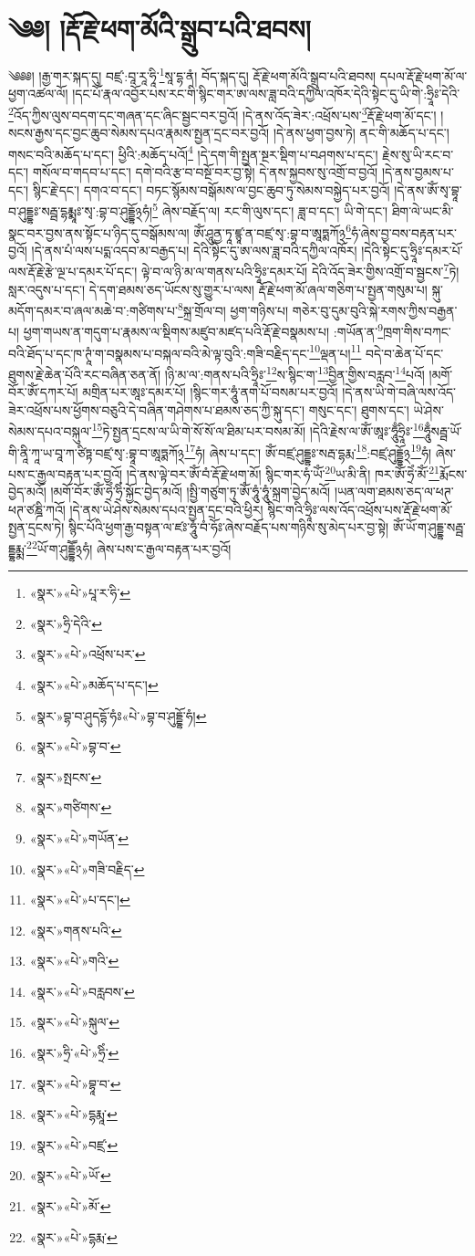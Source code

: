 \chapter{༄༅། །རྡོ་རྗེ་ཕག་མོའི་སྒྲུབ་པའི་ཐབས།}༄༅༅། །རྒྱ་གར་སྐད་དུ། བཛྲ་:བཱ་རཱ་ཧཱི་\footnote{«སྣར་»«པེ་»པཱ་ར་ཧི་}སཱ་དྷ་ནཾ། བོད་སྐད་དུ། རྡོ་རྗེ་ཕག་མོའི་སྒྲུབ་པའི་ཐབས། དཔལ་རྡོ་རྗེ་ཕག་མོ་ལ་ཕྱག་འཚལ་ལོ། །དང་པོ་རྣལ་འབྱོར་པས་རང་གི་སྙིང་གར་ཨ་ལས་ཟླ་བའི་དཀྱིལ་འཁོར་དེའི་སྟེང་དུ་ཡི་གེ་:ཧྲཱིཿ་དེའི་\footnote{«སྣར་»ཧྲི་དེའི་}འོད་ཀྱིས་ལུས་བདག་དང་གཞན་དང་ཞིང་སྦྱང་བར་བྱའོ། །དེ་ནས་འོད་ཟེར་:འཕྲོས་པས་\footnote{«སྣར་»«པེ་»འཕྲོས་པར་}རྡོ་རྗེ་ཕག་མོ་དང་། །སངས་རྒྱས་དང་བྱང་ཆུབ་སེམས་དཔའ་རྣམས་སྤྱན་དྲང་བར་བྱའོ། །དེ་ནས་ཕྱག་བྱས་ཏེ། ནང་གི་མཆོད་པ་དང་། གསང་བའི་མཆོད་པ་དང་། ཕྱིའི་:མཆོད་པའོ།\footnote{«སྣར་»«པེ་»མཆོད་པ་དང་།} །དེ་དག་གི་སྤྱན་སྔར་སྡིག་པ་བཤགས་པ་དང་། རྗེས་སུ་ཡི་རང་བ་དང་། གསོལ་བ་གདབ་པ་དང་། དགེ་བའི་རྩ་བ་བསྔོ་བར་བྱ་སྟེ། དེ་ནས་སྐྱབས་སུ་འགྲོ་བ་བྱའོ། །དེ་ནས་བྱམས་པ་དང་། སྙིང་རྗེ་དང་། དགའ་བ་དང་། བཏང་སྙོམས་བསྒོམས་ལ་བྱང་ཆུབ་ཏུ་སེམས་བསྐྱེད་པར་བྱའོ། །དེ་ནས་ཨོཾ་སྭ་བྷཱ་བ་ཤུདྡྷཿ་སརྦྦ་དྷརྨྨཱཿ་སྭ་:བྷ་བ་ཤུདྡྷོ྅ཧཾ།\footnote{«སྣར་»བྷ་བ་ཤུདདྷོ་ཧཾཿ«པེ་»བྷ་བ་ཤུདྡྷོ་ཧཾ།} ཞེས་བརྗོད་ལ། རང་གི་ལུས་དང་། ཟླ་བ་དང་། ཡི་གེ་དང་། ཐིག་ལེ་ཡང་མི་སྣང་བར་བྱས་ནས་སྟོང་པ་ཉིད་དུ་བསྒོམས་ལ། ཨོཾ་ཤཱུནྱ་ཏཱ་ཛྙཱ་ན་བཛྲ་སྭ་:བྷ་བ་ཨཱཏྨཀོ྅\footnote{«སྣར་»«པེ་»བྷ་བ་}ཧཾ་ཞེས་བྱ་བས་བརྟན་པར་བྱའོ། །དེ་ནས་པཾ་ལས་པདྨ་འདབ་མ་བརྒྱད་པ། དེའི་སྟེང་དུ་ཨ་ལས་ཟླ་བའི་དཀྱིལ་འཁོར། །དེའི་སྟེང་དུ་ཧྲཱིཿ་དམར་པོ་ལས་རྡོ་རྗེ་རྩེ་ལྔ་པ་དམར་པོ་དང་། ལྟེ་བ་ལ་ཉི་མ་ལ་གནས་པའི་ཧྲཱིཿ་དམར་པོ། དེའི་འོད་ཟེར་གྱིས་འགྲོ་བ་སྦྱངས་\footnote{«སྣར་»སྤངས་}ཏེ། སླར་འདུས་པ་དང་། དེ་དག་ཐམས་ཅད་ཡོངས་སུ་གྱུར་པ་ལས། རྡོ་རྗེ་ཕག་མོ་ཞལ་གཅིག་པ་སྤྱན་གསུམ་པ། སྐུ་མདོག་དམར་བ་ཞལ་མཆེ་བ་:གཙིགས་པ་\footnote{«སྣར་»གཙིགས་}སྐྲ་གྲོལ་བ། ཕྱག་གཉིས་པ། གཅེར་བུ་དུམ་བུའི་སྐེ་རགས་ཀྱིས་བརྒྱན་པ། ཕྱག་གཡས་ན་གདུག་པ་རྣམས་ལ་སྡིགས་མཛུབ་མཛད་པའི་རྡོ་རྗེ་བསྣམས་པ། :གཡོན་ན་\footnote{«སྣར་»«པེ་»གཡོན་}ཁྲག་གིས་བཀང་བའི་ཐོད་པ་དང་ཁ་ཊཱཾ་ག་བསྣམས་པ་བསྐལ་བའི་མེ་ལྟ་བུའི་:གཟི་བརྗིད་དང་\footnote{«སྣར་»«པེ་»གཟི་བརྗིད་}ལྡན་པ།\footnote{«སྣར་»«པེ་»པ་དང་།} བདེ་བ་ཆེན་པོ་དང་ཐུགས་རྗེ་ཆེན་པོའི་རང་བཞིན་ཅན་ནོ། །ཉི་མ་ལ་:གནས་པའི་ཧྲཱིཿ་\footnote{«སྣར་»གནས་པའི་}ས་སྙིང་ག་\footnote{«སྣར་»«པེ་»གའི་}བྱིན་གྱིས་བརླབ་\footnote{«སྣར་»«པེ་»བརླབས་}པའོ། །མགོ་བོར་ཨོཾ་དཀར་པོ། མགྲིན་པར་ཨཱཿ་དམར་པོ། །སྙིང་གར་ཧཱུཾ་ནག་པོ་བསམ་པར་བྱའོ། །དེ་ནས་ཡི་གེ་བཞི་ལས་འོད་ཟེར་འཕྲོས་པས་ཕྱོགས་བཅུའི་དེ་བཞིན་གཤེགས་པ་ཐམས་ཅད་ཀྱི་སྐུ་དང་། གསུང་དང་། ཐུགས་དང་། ཡེ་ཤེས་སེམས་དཔའ་བསྐུལ་\footnote{«སྣར་»«པེ་»སྐུལ་}ཏེ་སྤྱན་དྲངས་ལ་ཡི་གེ་སོ་སོ་ལ་ཐིམ་པར་བསམ་མོ། །དེའི་རྗེས་ལ་ཨོཾ་ཨཱཿ་ཧཱུྃཧྲཱིཿ་\footnote{«སྣར་»ཧྲི་«པེ་»ཧྲིཾ་}ཧཱུྃསརྦྦ་ཡོ་གི་ནཱི་ཀཱ་ཡ་བཱ་ཀ་ཙིཏྟ་བཛྲ་སྭ་:བྷཱ་བ་ཨཱཏྨཀོ྅\footnote{«སྣར་»«པེ་»བྷཱ་བ་}ཧཾ། ཞེས་པ་དང་། ཨོཾ་བཛྲ་ཤུདྡྷཿ་སརྦ་དྷརྨ་\footnote{«སྣར་»«པེ་»དྷརྨཱ་}:བཛྲ་ཤུདྡྷོ྅\footnote{«སྣར་»«པེ་»བཛྲ་}ཧཾ། ཞེས་པས་ང་རྒྱལ་བརྟན་པར་བྱའོ། །དེ་ནས་ལྟེ་བར་ཨོཾ་བཾ་རྡོ་རྗེ་ཕག་མོ། སྙིང་གར་ཧཾ་ཡོཾ་\footnote{«སྣར་»«པེ་»ཡོ་}ཡ་མི་ནི། ཁར་ཨོཾ་ཧྲེཾ་མོཾ་\footnote{«སྣར་»«པེ་»མོ་}རྨོངས་བྱེད་མའོ། །མགོ་བོར་ཨོཾ་ཧྲེཾ་ཧྲིཾ་སྐྱོང་བྱེད་མའོ། །སྤྱི་གཙུག་ཏུ་ཨོཾ་ཧཱུཾ་ཧཱུཾ་སྐྲག་བྱེད་མའོ། །ཡན་ལག་ཐམས་ཅད་ལ་ཕཊ་ཕཊ་ཙཎྜི་ཀའོ། །དེ་ནས་ཡེ་ཤེས་སེམས་དཔའ་སྤྱན་དྲང་བའི་ཕྱིར། སྙིང་གའི་ཧྲཱིཿ་ལས་འོད་འཕྲོས་པས་རྡོ་རྗེ་ཕག་མོ་སྤྱན་དྲངས་ཏེ། སྙིང་པོའི་ཕྱག་རྒྱ་བསྟན་ལ་ཛཿ་ཧཱུཾ་བཾ་ཧོཿ་ཞེས་བརྗོད་པས་གཉིས་སུ་མེད་པར་བྱ་སྟེ། ཨོཾ་ཡོ་ག་ཤུདྡྷ་སརྦྦ་དྡྷརྨྨ་\footnote{«སྣར་»«པེ་»དྷརྨ་}ཡོ་ག་ཤུདྡྷཽ྅ཧཾ། ཞེས་པས་ང་རྒྱལ་བརྟན་པར་བྱའོ། 